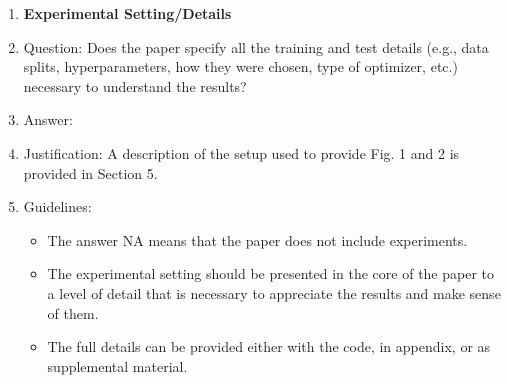 \documentclass{article}
\begin{document}
\begin{enumerate}
\item {\bf Experimental Setting/Details}
    \item[] Question: Does the paper specify all the training and test details (e.g., data splits, hyperparameters, how they were chosen, type of optimizer, etc.) necessary to understand the results?
    \item[] Answer: \answerYes{} %
    \item[] Justification: A description of the setup used to provide Fig. 1 and 2 is provided in Section 5.
    \item[] Guidelines:
    \begin{itemize}
        \item The answer NA means that the paper does not include experiments.
        \item The experimental setting should be presented in the core of the paper to a level of detail that is necessary to appreciate the results and make sense of them.
        \item The full details can be provided either with the code, in appendix, or as supplemental material.
    \end{itemize}


\end{enumerate}
\end{document}
